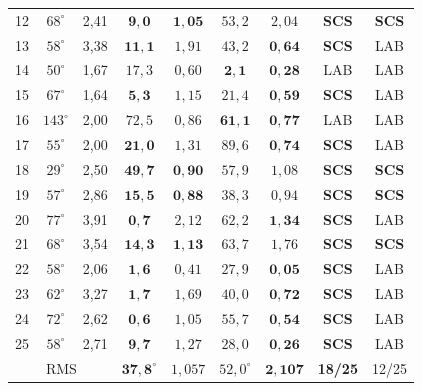 \documentclass[12pt,a4paper]{article}
\begin{document}
\begin{table}[ht]
\begin{tabular}{ccccccccc}
12 & $68^\circ$  & 2,41 & $\mathbf{9{,}0}$  & $\mathbf{1{,}05}$ & $53{,}2$ & $2{,}04$ & \textbf{SCS} & \textbf{SCS} \\
13 & $58^\circ$  & 3,38 & $\mathbf{11{,}1}$ & $1{,}91$ & $43{,}2$ & $\mathbf{0{,}64}$ & \textbf{SCS} & LAB \\
14 & $50^\circ$  & 1,67 & $17{,}3$ & $0{,}60$ & $\mathbf{2{,}1}$  & $\mathbf{0{,}28}$ & LAB & LAB \\
15 & $67^\circ$  & 1,64 & $\mathbf{5{,}3}$  & $1{,}15$ & $21{,}4$ & $\mathbf{0{,}59}$ & \textbf{SCS} & LAB \\
16 & $143^\circ$ & 2,00 & $72{,}5$ & $0{,}86$ & $\mathbf{61{,}1}$ & $\mathbf{0{,}77}$ & LAB & LAB \\
17 & $55^\circ$  & 2,00 & $\mathbf{21{,}0}$ & $1{,}31$ & $89{,}6$ & $\mathbf{0{,}74}$ & \textbf{SCS} & LAB \\
18 & $29^\circ$  & 2,50 & $\mathbf{49{,}7}$ & $\mathbf{0{,}90}$ & $57{,}9$ & $1{,}08$ & \textbf{SCS} & \textbf{SCS} \\
19 & $57^\circ$  & 2,86 & $\mathbf{15{,}5}$ & $\mathbf{0{,}88}$ & $38{,}3$ & $0{,}94$ & \textbf{SCS} & \textbf{SCS} \\
20 & $77^\circ$  & 3,91 & $\mathbf{0{,}7}$  & $2{,}12$ & $62{,}2$ & $\mathbf{1{,}34}$ & \textbf{SCS} & LAB \\
21 & $68^\circ$  & 3,54 & $\mathbf{14{,}3}$ & $\mathbf{1{,}13}$ & $63{,}7$ & $1{,}76$ & \textbf{SCS} & \textbf{SCS} \\
22 & $58^\circ$  & 2,06 & $\mathbf{1{,}6}$  & $0{,}41$ & $27{,}9$ & $\mathbf{0{,}05}$ & \textbf{SCS} & LAB \\
23 & $62^\circ$  & 3,27 & $\mathbf{1{,}7}$  & $1{,}69$ & $40{,}0$ & $\mathbf{0{,}72}$ & \textbf{SCS} & LAB \\
24 & $72^\circ$  & 2,62 & $\mathbf{0{,}6}$  & $1{,}05$ & $55{,}7$ & $\mathbf{0{,}54}$ & \textbf{SCS} & LAB \\
25 & $58^\circ$  & 2,71 & $\mathbf{9{,}7}$  & $1{,}27$ & $28{,}0$ & $\mathbf{0{,}26}$ & \textbf{SCS} & LAB \\
\midrule
\multicolumn{3}{c}{RMS}  & $\mathbf{37{,}8^\circ}$ & $1{,}057$ & $52{,}0^\circ$ & $\mathbf{2{,}107}$ & \textbf{18/25} & 12/25 \\
\bottomrule
\end{tabular}
\end{table}
\end{document}
